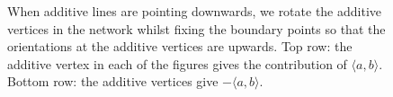 \begin{figure}
\begin{center}
\end{center}
    \caption{When additive lines are pointing downwards, we rotate the additive vertices in the network whilst fixing the boundary points so that the orientations at the additive vertices are upwards. Top row: the additive vertex in each of the figures gives the contribution of $\langle a,b\rangle$. Bottom row: the additive vertices give $-\langle a,b\rangle$. }
    \label{fig_1007}
\end{figure}
